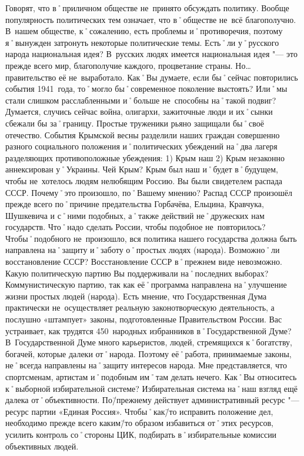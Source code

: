 \begin{drama}
\pagebreak
	
	\maxspeaks Говорят, что в˚приличном обществе не~принято обсуждать политику. Вообще популярность политических тем означает, что в˚обществе не~всё благополучно. В~нашем обществе, к˚сожалению, есть проблемы и˚противоречия, поэтому я˚вынужден затронуть некоторые политические темы. Есть˚ли у˚русского народа национальная идея?
	\michaelspeaks В~русских людях имеется национальная идея "--- это прежде всего мир, благополучие каждого, процветание страны. Но… правительство её не~выработало.
	\maxspeaks Как˚Вы думаете, если бы˚сейчас повторились события 1941~года, то˚могло бы˚современное поколение выстоять? Или˚мы стали слишком расслабленными и˚больше не~способны на˚такой подвиг?
	\michaelspeaks Думается, случись сейчас война, олигархи, зажиточные люди и их˚сынки сбежали бы за˚границу. Простые труженики рьяно защищали бы˚своё отечество.
	\maxspeaks События Крымской весны разделили наших граждан совершенно разного социального положения и˚политических убеждений на˚два лагеря разделяющих противоположные убеждения: 1) Крым наш 2) Крым незаконно аннексирован у˚Украины. Чей Крым?
	\michaelspeaks Крым был наш и˚будет в˚будущем, чтобы не~хотелось людям нелюбящим Россию.
	\maxspeaks Вы были свидетелем распада СССР. Почему˚это произошло, по˚Вашему мнению? 
	\michaelspeaks Распад СССР произошёл прежде всего по˚причине предательства Горбачёва, Ельцина, Кравчука, Шушкевича и с˚ними подобных, а˚также действий не˚дружеских нам государств.	
	\maxspeaks Что˚надо сделать России, чтобы подобное не~повторилось? 
	\michaelspeaks Чтобы˚подобного не~произошло, вся политика нашего государства должна быть направлена на˚защиту и˚заботу о˚простых людях (народа).
	\maxspeaks Возможно˚ли восстановление СССР?
	\michaelspeaks Восстановление СССР в˚прежнем виде невозможно. 
	\maxspeaks Какую политическую партию Вы поддерживали на˚последних выборах? 
	\michaelspeaks Коммунистическую партию, так как её˚программа направлена на˚улучшение жизни простых людей (народа).
	\maxspeaks Есть мнение, что Государственная Дума практически не~осуществляет реальную законотворческую деятельность, а послушно «штампует» законы, подготовленные Правительством России. Вас устраивает, как трудятся 450~народных избранников в˚Государственной Думе? 
	\michaelspeaks В~Государственной Думе много карьеристов, людей, стремящихся к˚богатству, богачей, которые далеки от˚народа. Поэтому её˚работа, принимаемые законы, не˚всегда направлены на˚защиту интересов народа. Мне представляется, что спортсменам, артистам и˚подобным им˚там делать нечего.
	\maxspeaks Как˚Вы относитесь к˚выборной избирательной системе? 
	\michaelspeaks Избирательная система на˚наш взгляд ещё далека от˚объективности. По\=/прежнему действует административный ресурс "--- ресурс партии «Единая Россия». Чтобы˚как\=/то исправить положение дел, необходимо прежде всего каким\=/то образом избавиться от˚этих ресурсов, усилить контроль со˚стороны ЦИК, подбирать в˚избирательные комиссии объективных людей.	
	

\end{drama}
